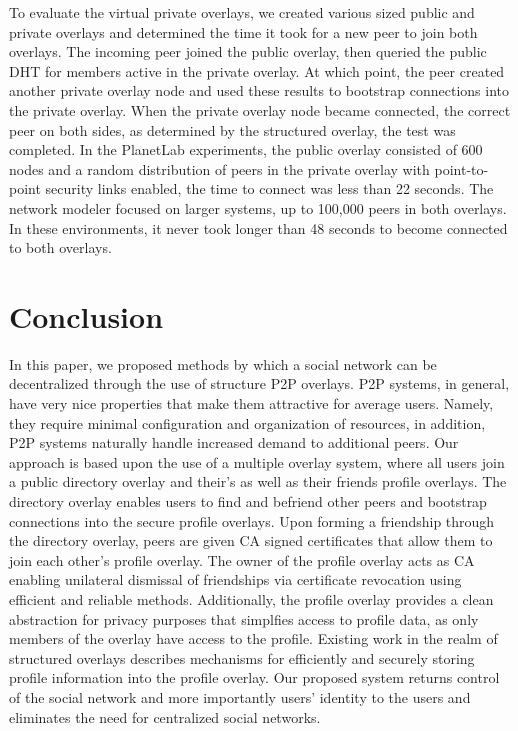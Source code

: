 \documentclass[conference]{IEEEtran}
\begin{document}
To evaluate the virtual private overlays, we created various sized public and
private overlays and determined the time it took for a new peer to join both
overlays.  The incoming peer joined the public overlay, then queried the public
DHT for members active in the private overlay.  At which point, the peer
created another private overlay node and used these results to bootstrap
connections into the private overlay.  When the private overlay node became
connected, the correct peer on both sides, as determined by the structured
overlay, the test was completed.  In the PlanetLab experiments, the public
overlay consisted of 600 nodes and a random distribution of peers in the
private overlay with point-to-point security links enabled, the time to connect
was less than 22 seconds.  The network modeler focused on larger systems, up to
100,000 peers in both overlays.  In these environments, it never took longer
than 48 seconds to become connected to both overlays.

\section{Conclusion}
\label{conclusion}

In this paper, we proposed methods by which a social network can be
decentralized through the use of structure P2P overlays.  P2P systems, in
general, have very nice properties that make them attractive for average users.
Namely, they require minimal configuration and organization of resources, in
addition, P2P systems naturally handle increased demand to additional peers.
Our approach is based upon the use of a multiple overlay system, where all
users join a public directory overlay and their's as well as their friends
profile overlays.  The directory overlay enables users to find and befriend
other peers and bootstrap connections into the secure profile overlays.  Upon
forming a friendship through the directory overlay, peers are given CA signed
certificates that allow them to join each other's profile overlay.  The owner
of the profile overlay acts as CA enabling unilateral dismissal of friendships
via certificate revocation using efficient and reliable methods.  Additionally,
the profile overlay provides a clean abstraction for privacy purposes that
simplfies access to profile data, as only members of the overlay have access to
the profile.  Existing work in the realm of structured overlays describes
mechanisms for efficiently and securely storing profile information into the
profile overlay.  Our proposed system returns control of the social network and
more importantly users' identity to the users and eliminates the need for
centralized social networks.

\small{


}
\end{document}
